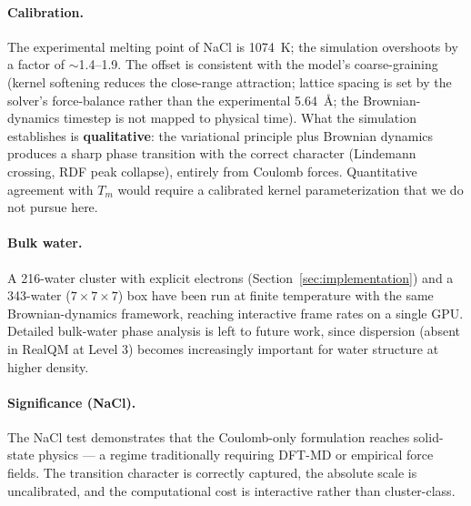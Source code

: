 \documentclass[11pt]{article}
\begin{document}
\paragraph{Calibration.}
The experimental melting point of NaCl is 1074~K; the simulation overshoots by a factor of $\sim$1.4--1.9. The offset is consistent with the model's coarse-graining (kernel softening reduces the close-range attraction; lattice spacing is set by the solver's force-balance rather than the experimental 5.64~\AA; the Brownian-dynamics timestep is not mapped to physical time). What the simulation establishes is \textbf{qualitative}: the variational principle plus Brownian dynamics produces a sharp phase transition with the correct character (Lindemann crossing, RDF peak collapse), entirely from Coulomb forces. Quantitative agreement with $T_m$ would require a calibrated kernel parameterization that we do not pursue here.

\paragraph{Bulk water.}
A 216-water cluster with explicit electrons (Section~\ref{sec:implementation}) and a 343-water ($7 \times 7 \times 7$) box have been run at finite temperature with the same Brownian-dynamics framework, reaching interactive frame rates on a single GPU. Detailed bulk-water phase analysis is left to future work, since dispersion (absent in RealQM at Level 3) becomes increasingly important for water structure at higher density.

\paragraph{Significance (NaCl).}
The NaCl test demonstrates that the Coulomb-only formulation reaches solid-state physics --- a regime traditionally requiring DFT-MD or empirical force fields. The transition character is correctly captured, the absolute scale is uncalibrated, and the computational cost is interactive rather than cluster-class.
\end{document}
